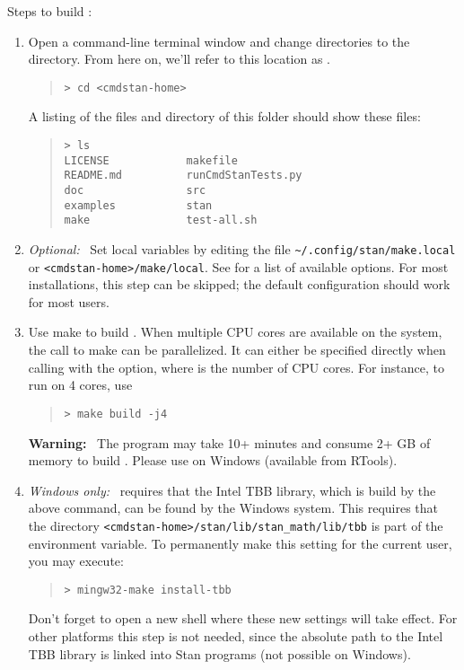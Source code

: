 Steps to build \CmdStan:
%
\begin{enumerate}
  \item Open a command-line terminal window and change directories to
    the \CmdStan directory. From here on, we'll refer to this location as
    .
    \begin{quote}
      \begin{Verbatim}[fontshape=sl]
> cd <cmdstan-home>
      \end{Verbatim}
    \end{quote}
    \noindent
    A listing of the files and directory of this folder should show these files:
    \begin{quote}
      \begin{Verbatim}
> ls
LICENSE            makefile
README.md          runCmdStanTests.py
doc                src
examples           stan
make               test-all.sh
      \end{Verbatim}
    \end{quote}
  \item \emph{Optional:} \, Set local  variables by editing
    the file \verb+~/.config/stan/make.local+ or
    \verb+<cmdstan-home>/make/local+. See 
    for a list of available options.  For most installations, this
    step can be skipped; the default configuration should work for
    most users.
  \item Use make to build \CmdStan. When multiple CPU cores are
    available on the system, the call to make can be parallelized.  It
    can either be specified directly when calling  with the
     option, where  is the
    number of CPU cores. For instance, to run on 4 cores, use
    \begin{quote}
      \begin{Verbatim}[fontshape=sl]
> make build -j4
      \end{Verbatim}
    \end{quote}
    \textbf{Warning:} \ The  program may take 10+ minutes and
    consume 2+ GB of memory to build \CmdStan. Please use
     on Windows (available from RTools).
  \item \emph{Windows only:} \, \CmdStan requires that the Intel TBB
    library, which is build by the above command, can be found by the
    Windows system. This requires that the directory
    \verb+<cmdstan-home>/stan/lib/stan_math/lib/tbb+ is part of the
     environment variable. To permanently make this setting
    for the current user, you may execute:
    \begin{quote}
      \begin{Verbatim}[fontshape=sl]
> mingw32-make install-tbb
      \end{Verbatim}
    \end{quote}
    Don't forget to open a new shell where these new settings will
    take effect. For other platforms this step is not needed, since
    the absolute path to the Intel TBB library is linked into Stan
    programs (not possible on Windows).
\end{enumerate}
